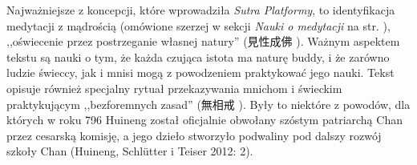 Najważniejsze z koncepcji, które wprowadziła \textit{Sutra Platformy}, to identyfikacja medytacji z mądrością (omówione szerzej w sekcji \textit{Nauki o medytacji} na str. \pageref{DingHui}), ,,oświecenie przez postrzeganie własnej natury'' (見性成佛 ).
Ważnym aspektem tekstu są nauki o tym, że każda czująca istota ma naturę buddy, i że zarówno ludzie świeccy, jak i mnisi mogą z powodzeniem praktykować jego nauki.
Tekst opisuje również specjalny rytuał przekazywania mnichom i świeckim praktykującym ,,bezforemnych zasad'' (無相戒 ). %
Były to niektóre z powodów, dla których w roku 796 Huineng został oficjalnie obwołany szóstym patriarchą Chan przez cesarską komisję, a jego dzieło stworzyło podwaliny pod dalszy rozwój szkoły Chan
(Huineng, Schlütter i Teiser 2012: 2).
